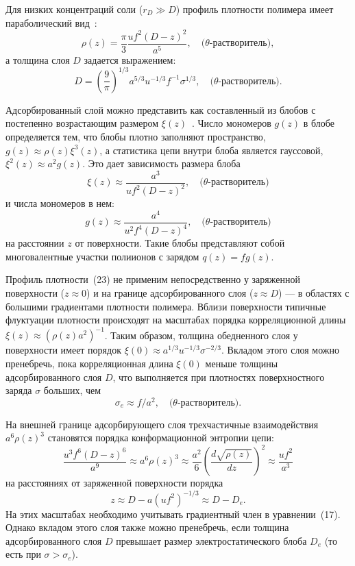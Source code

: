 \documentclass[12pt,a4paper]{article}
\begin{document}
Для низких концентраций соли ($r_D \gg D$) профиль плотности полимера имеет параболический вид~\cite{Dobrynin2000a, Dobrynin2000b}:
\begin{equation}
\rho(z) = \frac{\pi}{3} \frac{u f^2 (D - z)^2}{a^5}, \quad \text{($\theta$-растворитель)},
\end{equation}
а толщина слоя $D$ задается выражением:
\begin{equation}
D = \left(\frac{9}{\pi}\right)^{1/3} a^{5/3} u^{-1/3} f^{-1} \sigma^{1/3}, \quad \text{($\theta$-растворитель)}.
\end{equation}

Адсорбированный слой можно представить как составленный из блобов с постепенно возрастающим размером $\xi(z)$~\cite{Dobrynin2000a, Dobrynin2000b}. Число мономеров $g(z)$ в блобе определяется тем, что блобы плотно заполняют пространство, $g(z) \approx \rho(z)\xi^3(z)$, а статистика цепи внутри блоба является гауссовой, $\xi^2(z) \approx a^2 g(z)$. Это дает зависимость размера блоба
\begin{equation}
\xi(z) \approx \frac{a^3}{u f^2 (D - z)^2}, \quad \text{($\theta$-растворитель)}
\end{equation}
и числа мономеров в нем:
\begin{equation}
g(z) \approx \frac{a^4}{u^2 f^4 (D - z)^4}, \quad \text{($\theta$-растворитель)}
\end{equation}
на расстоянии $z$ от поверхности. Такие блобы представляют собой многовалентные участки полиионов с зарядом $q(z) = f g(z)$.

Профиль плотности~(23) не применим непосредственно у заряженной поверхности ($z \approx 0$) и на границе адсорбированного слоя ($z \approx D$) --- в областях с большими градиентами плотности полимера. Вблизи поверхности типичные флуктуации плотности происходят на масштабах порядка корреляционной длины $\xi(z) \approx (\rho(z) a^2)^{-1}$. Таким образом, толщина обедненного слоя у поверхности имеет порядок $\xi(0) \approx a^{1/3} u^{-1/3} \sigma^{-2/3}$. Вкладом этого слоя можно пренебречь, пока корреляционная длина $\xi(0)$ меньше толщины адсорбированного слоя $D$, что выполняется при плотностях поверхностного заряда $\sigma$ больших, чем
\begin{equation}
\sigma_e \approx f / a^2, \quad \text{($\theta$-растворитель)}.
\end{equation}

На внешней границе адсорбирующего слоя трехчастичные взаимодействия $a^6 \rho(z)^3$ становятся порядка конформационной энтропии цепи:
\begin{equation}
\frac{u^3 f^6 (D - z)^6}{a^9} \approx a^6 \rho(z)^3 \approx \frac{a^2}{6} \left( \frac{d\sqrt{\rho(z)}}{dz} \right)^2 \approx \frac{u f^2}{a^3}
\end{equation}
на расстояниях от заряженной поверхности порядка
\begin{equation}
z \approx D - a (u f^2)^{-1/3} \approx D - D_e.
\end{equation}
На этих масштабах необходимо учитывать градиентный член в уравнении~(17). Однако вкладом этого слоя также можно пренебречь, если толщина адсорбированного слоя $D$ превышает размер электростатического блоба $D_e$ (то есть при $\sigma > \sigma_e$).
\end{document}
